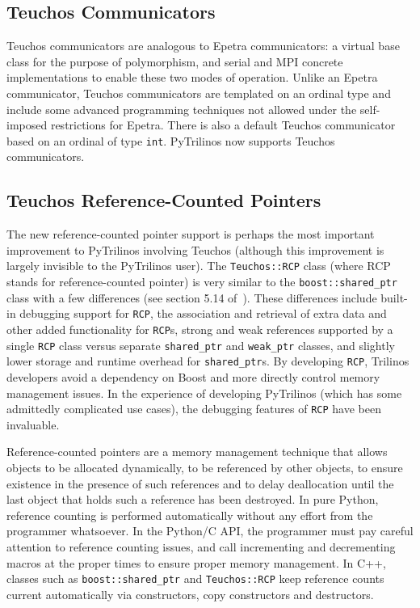 \documentclass[11pt]{article}
\begin{document}
\subsection{Teuchos Communicators}
\label{sec:teuchos_communicators}

Teuchos communicators are analogous to Epetra communicators: a virtual base class for the purpose of polymorphism, and serial and MPI concrete implementations to enable these two modes of operation.  Unlike an Epetra communicator, Teuchos communicators are templated on an ordinal type and include some advanced programming techniques not allowed under the self-imposed restrictions for Epetra.  There is also a default Teuchos communicator based on an ordinal of type {\tt int}.  PyTrilinos now supports Teuchos communicators.

\subsection{Teuchos Reference-Counted Pointers}
\label{sec:teuchos_rcp}

The new reference-counted pointer support is perhaps the most important improvement to PyTrilinos involving Teuchos (although this improvement is largely invisible to the PyTrilinos user).  The {\tt Teuchos::RCP} class (where RCP stands for reference-counted pointer) is very similar to the {\tt boost::shared\_ptr} class with a few differences (see section 5.14 of~\cite{TeuchosMemMgt}).  These differences include built-in debugging support for {\tt RCP}, the association and retrieval of extra data and other added functionality for {\tt RCP}s, strong and weak references supported by a single {\tt RCP} class versus separate {\tt shared\_ptr} and {\tt weak\_ptr} classes, and slightly lower storage and runtime overhead for {\tt shared\_ptr}s. By developing {\tt RCP}, Trilinos developers avoid a dependency on Boost and more directly control memory management issues.  In the experience of developing PyTrilinos (which has some admittedly complicated use cases), the debugging features of {\tt RCP} have been invaluable.

Reference-counted pointers are a memory management technique that allows objects to be allocated dynamically, to be referenced by other objects, to ensure existence in the presence of such references and to delay deallocation until the last object that holds such a reference has been destroyed.  In pure Python, reference counting is performed automatically without any effort from the programmer whatsoever.  In the Python/C API, the programmer must pay careful attention to reference counting issues, and call incrementing and decrementing macros at the proper times to ensure proper memory management.  In C++, classes such as {\tt boost::shared\_ptr} and {\tt Teuchos::RCP} keep reference counts current automatically via constructors, copy constructors and destructors.
\end{document}
